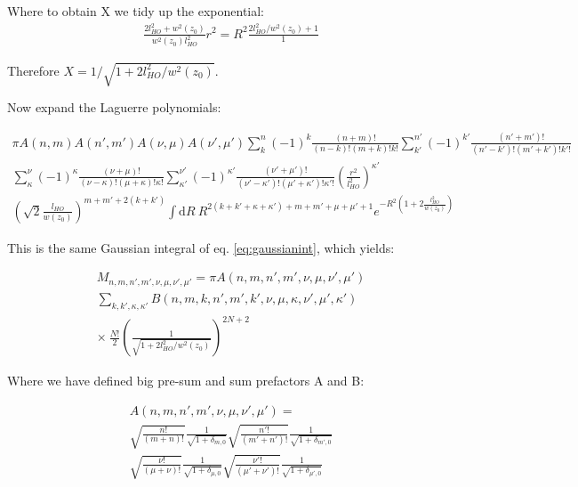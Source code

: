 \documentclass[a4paper,twocolumn,nobalancelastpage]{revtex4-1}
\begin{document}
Where to obtain X we tidy up the exponential:
\begin{align}
\frac{2 l^2_{HO}+w^2(z_0)}{w^2(z_0) l_{HO}^2} r^2 = R^2 \frac{2 l^2_{HO}/w^2(z_0)+1}{1}
\end{align}

Therefore $X=1/ \sqrt{1+2 l^2_{HO}/w^2(z_0)}$.

Now expand the Laguerre polynomials:

\begin{widetext}

\begin{multline}
\pi A(n,m) A(n',m') A(\nu, \mu) A(\nu', \mu') \sum_{k}^{n}(-1)^{k} \frac{(n+m)!}{(n-k)!(m+k)!k!}  \sum_{k'}^{n'}(-1)^{k'} \frac{(n'+m')!}{(n'-k')!(m'+k')!k'!} \\
\sum_{\kappa}^{\nu}(-1)^{\kappa} \frac{(\nu+\mu)!}{(\nu-\kappa)!(\mu+\kappa)!\kappa!} 
\sum_{\kappa'}^{\nu'}(-1)^{\kappa'} \frac{(\nu'+\mu')!}{(\nu'-\kappa')!(\mu'+\kappa')!\kappa'!} \left(\frac{r^2}{l^2_{HO}}\right)^{\kappa'}
  \\  \left(\sqrt{2}\frac{l_{HO}}{w(z_{0})}\right)^{m+m'+2(k+k')} 
\int \mathrm{d}R \ 
R^{2(k+k'+\kappa+\kappa')+m+m'+\mu+\mu'+1} e^{- R^2(1+2\frac{l^2_{HO}}{w(z_0)})}
\end{multline}

\end{widetext}

This is the same Gaussian integral of eq. \eqref{eq:gaussianint}, which yields:

\begin{multline}
\label{eq:intfoureqn}
M_{n,m,n',m',\nu,\mu,\nu',\mu'} =\pi A(n,m,n',m',\nu,\mu,\nu',\mu') \\ \sum_{k, k', \kappa, \kappa'} B(n,m,k,n',m',k',\nu,\mu,\kappa,\nu',\mu',\kappa') \\ \times \ \frac{N!}{2} \left(\frac{1}{\sqrt{1+2 l^2_{HO}/w^2(z_0)}}\right)^{2N+2}
\end{multline}

Where we have defined big pre-sum and sum prefactors A and B:

\begin{multline}
A(n,m,n',m',\nu,\mu,\nu',\mu') = \\ \sqrt{\frac{n!}{(m+n)!}} \frac{1}{\sqrt{1+\delta_{m,0}}} \sqrt{\frac{n'!}{(m'+n')!}} \frac{1}{\sqrt{1+\delta_{m',0}}} \\
\sqrt{\frac{ \nu!}{(\mu+\nu)!}} \frac{1}{\sqrt{1+\delta_{\mu,0}}}
\sqrt{\frac{ \nu'!}{(\mu'+\nu')!}} \frac{1}{\sqrt{1+\delta_{\mu',0}}}
\end{multline}
\end{document}
